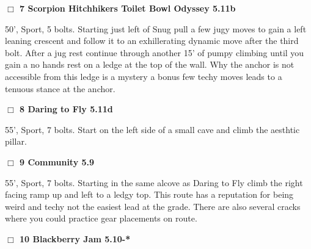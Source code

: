 \begin{multicols}{2}
\needspace{2em}
\label{rt:Scorpion Hitchhikers Toilet Bowl Odyssey}
\colorbox{RoyalBlue!20}{
\parbox{0.95\linewidth}{
\hspace{-1ex}\textbf{$\Box$
7 Scorpion Hitchhikers Toilet Bowl Odyssey 5.11b  
}}}
\begin{adjustwidth}{1.3em}{}			

50', Sport, 5 bolts. Starting just left of Snug pull a few jugy moves to gain a left leaning crescent and follow it to an exhillerating dynamic move after the third bolt. After a jug rest continue through another 15' of pumpy climbing until you gain a no hands rest on a ledge at the top of the wall. Why the anchor is not accessible from this ledge is a mystery a bonus few techy moves leads to a tenuous stance at the anchor.
\end{adjustwidth}




\needspace{2em}
\label{rt:Daring to Fly}
\colorbox{RoyalBlue!20}{
\parbox{0.95\linewidth}{
\hspace{-1ex}\textbf{$\Box$
8 Daring to Fly 5.11d  
}}}
\begin{adjustwidth}{1.3em}{}			

55', Sport, 7 bolts. Start on the left side of a small cave and climb the aesthtic pillar.
\end{adjustwidth}




\needspace{2em}
\label{rt:Community}
\colorbox{green!20}{
\parbox{0.95\linewidth}{
\hspace{-1ex}\textbf{$\Box$
9 Community 5.9  
}}}
\begin{adjustwidth}{1.3em}{}			

55', Sport, 7 bolts. Starting in the same alcove as Daring to Fly climb the right facing ramp up and left to a ledgy top. This route has a reputation for being weird and techy not the easiest lead at the grade. There are also several cracks where you could practice gear placements on route.
\end{adjustwidth}




\needspace{2em}
\label{rt:Blackberry Jam}
\colorbox{RoyalBlue!20}{
\parbox{0.95\linewidth}{
\hspace{-1ex}\textbf{$\Box$
10 Blackberry Jam 5.10-*  
}}}
\begin{adjustwidth}{1.3em}{}			


\end{adjustwidth}
\end{multicols}
